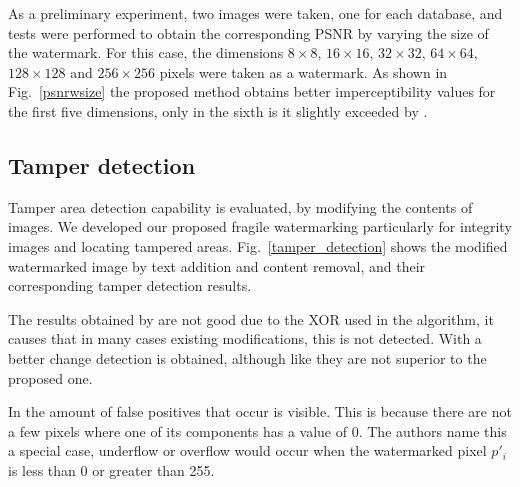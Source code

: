 \documentclass[runningheads]{llncs}
\begin{document}
As a preliminary experiment, two images were taken, one for each database, and tests were performed to obtain the corresponding PSNR by varying the size of the watermark. For this case, the dimensions $8\times 8$, $16\times 16$, $32\times 32$, $64\times 64$, $128\times 128$ and $256\times 256$ pixels were taken as a watermark. As shown in Fig.~\ref{psnrwsize} the proposed method obtains better imperceptibility values for the first five dimensions, only in the sixth is it slightly exceeded by \cite{shivani2017dual}.

\subsection{Tamper detection}
Tamper area detection capability is evaluated, by modifying the contents of images. We developed our proposed fragile watermarking particularly for integrity images and locating tampered areas. Fig.~\ref{tamper_detection} shows the modified watermarked image by text addition and content removal, and their corresponding tamper detection results.

The results obtained by \cite{shivani2017dual} are not good due to the XOR used in the algorithm, it causes that in many cases existing modifications, this is not detected. With \cite{liu2018blind} a better change detection is obtained, although like \cite{shivani2017dual} they are not superior to the proposed one.

In \cite{liu2018blind} the amount of false positives that occur is visible. This is because there are not a few pixels where one of its components has a value of 0. The authors name this a special case, underflow or overflow would occur when the watermarked pixel $p'_i$ is less than 0 or greater than 255.
\end{document}
